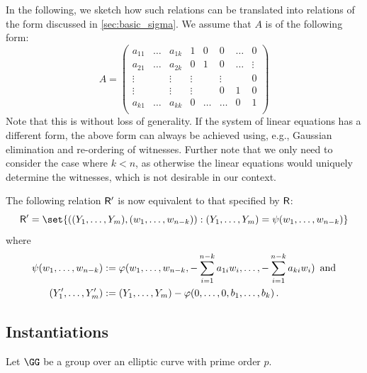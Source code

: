 \documentclass[11pt]{article}
\begin{document}
In the following, we sketch how such relations can be translated into relations of the form discussed in \cref{sec:basic_sigma}.
We assume that $A$ is of the following form:
\begin{equation*}
A = \left(\begin{array}{cccccccc}
      a_{11}     & \dots       & a_{1k}    & 1         & 0       & 0     & \dots    & 0\\
      a_{21}     & \dots       & a_{2k}    & 0         & 1       & 0     & \dots    & \vdots\\
      \vdots     &             & \vdots    & \vdots    &         & \vdots&          & 0\\
      \vdots     &             & \vdots    & \vdots    &         & 0     & 1        & 0\\
      a_{k1}     & \dots       & a_{kk}    & 0         & \dots   & \dots & 0        & 1\\
    \end{array}\right)
\end{equation*}
Note that this is without loss of generality.
If the system of linear equations has a different form, the above form can always be achieved using, e.g., Gaussian elimination and re-ordering of witnesses.
Further note that we only need to consider the case where $k<n$, as otherwise the linear equations would uniquely determine the witnesses, which is not desirable in our context.

The following relation $\mathsf{R}'$ is now equivalent to that specified by $\mathsf{R}$:
\begin{equation*}
\relation'=\set{((\statement_1,\dots,\statement_m),(\witness_1,\dots,\witness_{n-k})) :
(\statement_1,\dots,\statement_m)=\psi(\witness_1,\dots,\witness_{n-k})}
\end{equation*}
where
\begin{align*}
  \psi(w_1,\dots,w_{n-k}) &:= \varphi(w_1,\dots,w_{n-k},-\sum_{i=1}^{n-k}a_{1i}w_i,\dots,-\sum_{i=1}^{n-k}a_{ki}w_i)\,\text{ and}\\
  (Y_1',\dots,Y_m')   &:= (Y_1,\dots,Y_m) - \varphi(0,\dots,0,b_1,\dots,b_k)\,.
\end{align*}


\subsection{Instantiations}\label{sec:instantiations}
Let $\GG$ be a group over an elliptic curve with prime order $p$.
\end{document}
